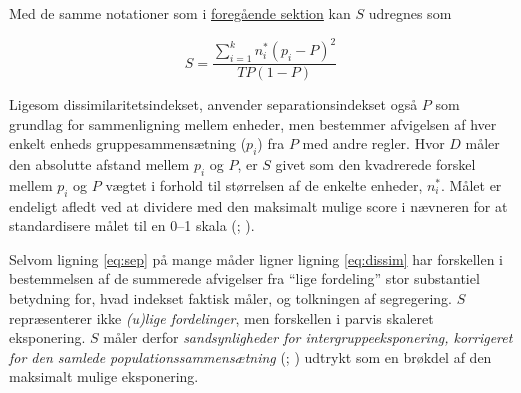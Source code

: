 \documentclass[
]{book}
\begin{document}
Med de samme notationer som i \hyperref[dissimkap]{foregående sektion} kan \(S\) udregnes som

\begin{equation}
\label{eq:sep}
S = \frac{{\textstyle \sum_{i=1}^{k}} n_{i}^{*} \left ( p_{i}-P \right )^{2} }{ TP \left ( 1-P \right ) } 
\end{equation}

Ligesom dissimilaritetsindekset, anvender separationsindekset også \(P\) som grundlag for sammenligning mellem enheder, men bestemmer afvigelsen af hver enkelt enheds gruppesammensætning (\(p_{i}\)) fra \(P\) med andre regler. Hvor \(D\) måler den absolutte afstand mellem \(p_{i}\) og \(P\), er \(S\) givet som den kvadrerede forskel mellem \(p_{i}\) og \(P\) vægtet i forhold til størrelsen af de enkelte enheder, \(n_{i}^{*}\). Målet er endeligt afledt ved at dividere med den maksimalt mulige score i nævneren for at standardisere målet til en 0--1 skala (; ).

Selvom ligning \eqref{eq:sep} på mange måder ligner ligning \eqref{eq:dissim} har forskellen i bestemmelsen af de summerede afvigelser fra ``lige fordeling'' stor substantiel betydning for, hvad indekset faktisk måler, og tolkningen af segregering. \(S\) repræsenterer ikke \emph{(u)lige fordelinger}, men forskellen i parvis skaleret eksponering. \(S\) måler derfor \emph{sandsynligheder for intergruppeeksponering, korrigeret for den samlede populationssammensætning} (; ) udtrykt som en brøkdel af den maksimalt mulige eksponering.
\end{document}
